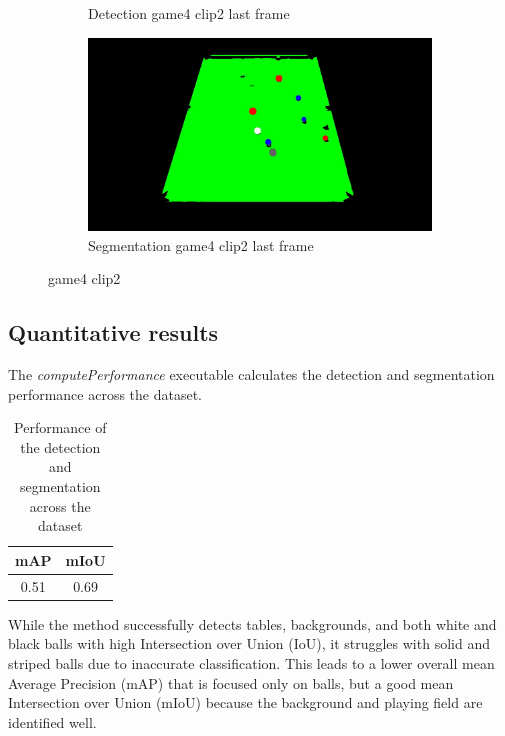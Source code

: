 \begin{figure}[H]
\begin{subfigure}[b]{0.35\textwidth}
        \caption{Detection game4 clip2 last frame}
        \label{fig: game4_clip2_last_frame_detected}
    \end{subfigure}
    \begin{subfigure}[b]{0.35\textwidth}
        \centering
        \includegraphics[width=\textwidth]{images/Segmentation/game4_clip2_segmented_balls_last_frame.jpg}
        \caption{Segmentation game4 clip2 last frame}
		\label{fig: game4_clip2_last_frame_segmented}
    \end{subfigure}
    
	\caption{game4 clip2}
\end{figure}


\subsection{Quantitative results}
The \textit{computePerformance} executable calculates the detection and segmentation performance across the dataset.
\begin{table}[H]
	\centering
    \begin{tabular}{|c|c|}
        \hline
        mAP & mIoU \\
        \hline
        0.51 & 0.69 \\
        \hline
    \end{tabular}
    \caption{Performance of the detection and segmentation across the dataset}
    \label{tab: performance across dataset}
\end{table}
While the method successfully detects tables, backgrounds, and both white and black balls with high Intersection
over Union (IoU), it struggles with solid and striped balls due to inaccurate classification.
This leads to a lower overall mean Average Precision (mAP) that is focused only on balls,
but a good mean Intersection over Union (mIoU) because the background and playing field are identified well.